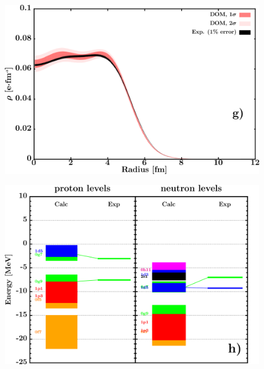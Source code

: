 \documentclass[twocolumn,secnumarabic,amssymb, nobibnotes, aps, prl,
superscriptaddress, nobalancelastpage, draft]{revtex4}
\begin{document}
\begin{figure}[!htb]
\begin{minipage}{0.4\linewidth}
        \label{DOM_sn112_neutron_inelastic}
    \end{minipage}
    \centering
    \begin{minipage}{0.4\linewidth}
        \centering
        \includegraphics[width=\linewidth]{figures/sn112_chargeDensity.png}
        \label{DOM_sn112_chargeDensity}
    \end{minipage}\hspace{6pt}
    \begin{minipage}{0.4\linewidth}
        \centering
        \includegraphics[width=\linewidth]{figures/sn112_SPLevels.png}
        \label{DOM_sn112_SPLevels}
    \end{minipage}
    \begin{minipage}{0.4\linewidth}
        \centering

\end{minipage}
\end{figure}
\end{document}
